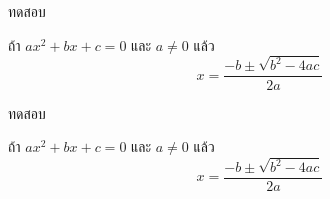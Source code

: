 \documentclass{beamer}
\begin{document}
\begin{frame}
	ทดสอบ
	\begin{theorem}
		ถ้า $ax^2+bx+c = 0$ และ $a \neq 0$ แล้ว 
		\[ x = \dfrac{-b\pm\sqrt{b^2-4ac}}{2a} \]
	\end{theorem}
\end{frame}

\begin{frame}
	ทดสอบ
	\begin{theorem}
		ถ้า $ax^2+bx+c = 0$ และ $a \neq 0$ แล้ว 
		\[ x = \dfrac{-b\pm\sqrt{b^2-4ac}}{2a} \]
	\end{theorem}
\end{frame}
\end{document}
